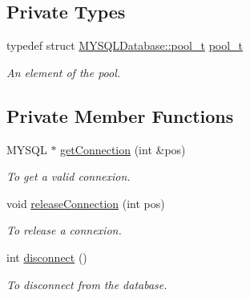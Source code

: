 \subsection*{Private Types}
\begin{DoxyCompactItemize}
\item 
\hypertarget{classMYSQLDatabase_a50a4db462aa1443e1bf95f302c5d1667}{
typedef struct \hyperlink{structMYSQLDatabase_1_1pool__t}{MYSQLDatabase::pool\_\-t} \hyperlink{classMYSQLDatabase_a50a4db462aa1443e1bf95f302c5d1667}{pool\_\-t}}
\label{classMYSQLDatabase_a50a4db462aa1443e1bf95f302c5d1667}

\begin{DoxyCompactList}\small\item\em An element of the pool. \item\end{DoxyCompactList}\end{DoxyCompactItemize}
\subsection*{Private Member Functions}
\begin{DoxyCompactItemize}
\item 
MYSQL $\ast$ \hyperlink{classMYSQLDatabase_aab2f9ef902b164de793094a4cb92144c}{getConnection} (int \&pos)
\begin{DoxyCompactList}\small\item\em To get a valid connexion. \item\end{DoxyCompactList}\item 
void \hyperlink{classMYSQLDatabase_a02068cf7e0dd72553013716d7aadabe7}{releaseConnection} (int pos)
\begin{DoxyCompactList}\small\item\em To release a connexion. \item\end{DoxyCompactList}\item 
int \hyperlink{classMYSQLDatabase_a4dc57bd6bec47b4e0c19163c1d6c7fbe}{disconnect} ()
\begin{DoxyCompactList}\small\item\em To disconnect from the database. \item\end{DoxyCompactList}\end{DoxyCompactItemize}
